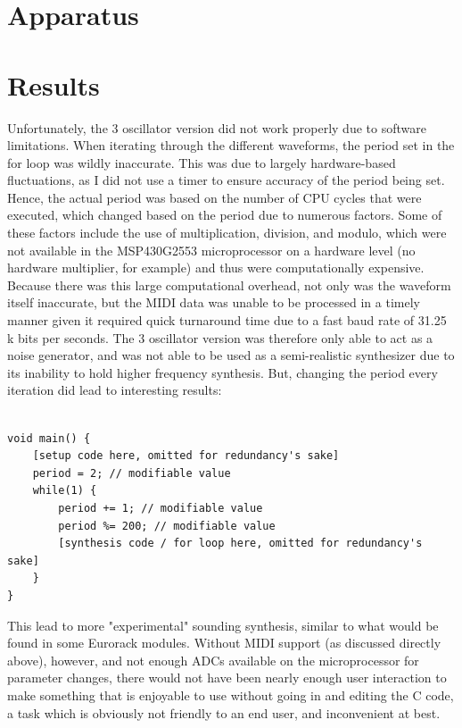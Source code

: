 \documentclass[12pt]{article}
\begin{document}
\section{Apparatus}\label{sec:apparatus}


\section{Results}\label{sec:results}

Unfortunately, the 3 oscillator version did not work properly due to software limitations.
When iterating through the different waveforms, the period set in the for loop was wildly inaccurate.
This was due to largely hardware-based fluctuations, as I did not use a timer to ensure accuracy of the period being set.
Hence, the actual period was based on the number of CPU cycles that were executed, which changed based on the period due to numerous factors.
Some of these factors include the use of multiplication, division, and modulo, which were not available in the MSP430G2553 microprocessor on a hardware level (no hardware multiplier, for example) and thus were computationally expensive.
Because there was this large computational overhead, not only was the waveform itself inaccurate, but the MIDI data was unable to be processed in a timely manner given it required quick turnaround time due to a fast baud rate of 31.25 k bits per seconds. 
The 3 oscillator version was therefore only able to act as a noise generator, and was not able to be used as a semi-realistic synthesizer due to its inability to hold higher frequency synthesis. But, changing the period every iteration did lead to interesting results:

\begin{lstlisting}

void main() {
    [setup code here, omitted for redundancy's sake]
    period = 2; // modifiable value
    while(1) {
        period += 1; // modifiable value
        period %= 200; // modifiable value
        [synthesis code / for loop here, omitted for redundancy's sake]
    }
}
\end{lstlisting}

This lead to more "experimental" sounding synthesis, similar to what would be found in some Eurorack modules. Without MIDI support (as discussed directly above), however, and not enough ADCs available on the microprocessor for parameter changes, there would not have been nearly enough user interaction to make something that is enjoyable to use without going in and editing the C code, a task which is obviously not friendly to an end user, and inconvenient at best. 
\end{document}
